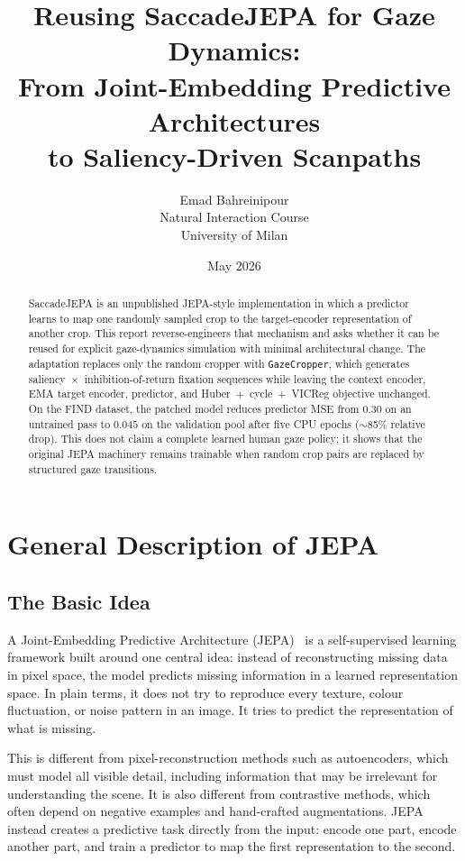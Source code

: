 \documentclass[12pt,a4paper]{article}
\title{Reusing SaccadeJEPA for Gaze Dynamics:\\
  From Joint-Embedding Predictive Architectures\\
  to Saliency-Driven Scanpaths}
\author{Emad Bahreinipour\\[0.35em]
  \small Natural Interaction Course\\
  \small University of Milan}
\date{May 2026}
\begin{document}
\maketitle

\begin{abstract}
SaccadeJEPA is an unpublished JEPA-style implementation in which a predictor
learns to map one randomly sampled crop to the target-encoder representation of
another crop. This report reverse-engineers that mechanism and asks whether it
can be reused for explicit gaze-dynamics simulation with minimal architectural
change. The adaptation replaces only the random cropper with
\texttt{GazeCropper}, which generates saliency~$\times$~inhibition-of-return
fixation sequences while leaving the context encoder, EMA target encoder,
predictor, and Huber~+~cycle~+~VICReg objective unchanged. On the FIND dataset,
the patched model reduces predictor MSE from $0.30$ on an untrained pass to
$0.045$ on the validation pool after five CPU epochs ($\sim$85\% relative drop). This does not claim a complete
learned human gaze policy; it shows that the original JEPA machinery remains
trainable when random crop pairs are replaced by structured gaze transitions.
\end{abstract}

\section{General Description of JEPA}
\label{sec:jepa}

\subsection{The Basic Idea}
\label{subsec:jepa-motivation}

A Joint-Embedding Predictive Architecture (JEPA)~\cite{lecun2022path} is a
self-supervised learning framework built around one central idea: instead of
reconstructing missing data in pixel space, the model predicts missing
information in a learned representation space. In plain terms, it does not try
to reproduce every texture, colour fluctuation, or noise pattern in an image.
It tries to predict the representation of what is missing.

This is different from pixel-reconstruction methods such as autoencoders, which
must model all visible detail, including information that may be irrelevant for
understanding the scene. It is also different from contrastive methods, which
often depend on negative examples and hand-crafted augmentations. JEPA instead
creates a predictive task directly from the input: encode one part, encode
another part, and train a predictor to map the first representation to the
second.
\end{document}
